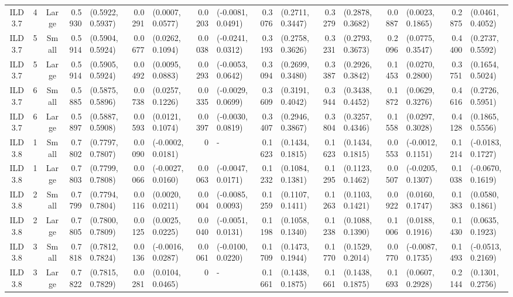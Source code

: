 \begin{landscape}
\begin{table}
\begin{tabular}{cccrlrlrlrlrlrlrl}
ILD3.7	&	4	&	Large	&	0.5930	&	(0.5922, 0.5937)	&	0.0291	&	(0.0007, 0.0577)	&	0.0203	&	(-0.0081, 0.0491)	&	0.3076	&	(0.2711, 0.3447)	&	0.3279	&	(0.2878, 0.3682)	&	0.0887	&	(0.0023, 0.1865)	&	0.2875	&	(0.0461, 0.4052)	\\
ILD3.7	&	5	&	Small	&	0.5914	&	(0.5904, 0.5924)	&	0.0677	&	(0.0262, 0.1094)	&	0.0038	&	(-0.0241, 0.0312)	&	0.3193	&	(0.2758, 0.3626)	&	0.3231	&	(0.2793, 0.3673)	&	0.2096	&	(0.0775, 0.3547)	&	0.4400	&	(0.2737, 0.5592)	\\
ILD3.7	&	5	&	Large	&	0.5914	&	(0.5905, 0.5924)	&	0.0492	&	(0.0095, 0.0883)	&	0.0293	&	(-0.0053, 0.0642)	&	0.3094	&	(0.2699, 0.3480)	&	0.3387	&	(0.2926, 0.3842)	&	0.1453	&	(0.0270, 0.2800)	&	0.3751	&	(0.1654, 0.5024)	\\
ILD3.7	&	6	&	Small	&	0.5885	&	(0.5875, 0.5896)	&	0.0738	&	(0.0257, 0.1226)	&	0.0335	&	(-0.0029, 0.0699)	&	0.3609	&	(0.3191, 0.4042)	&	0.3944	&	(0.3438, 0.4452)	&	0.1872	&	(0.0629, 0.3276)	&	0.4616	&	(0.2726, 0.5951)	\\
ILD3.7	&	6	&	Large	&	0.5897	&	(0.5887, 0.5908)	&	0.0593	&	(0.0121, 0.1074)	&	0.0397	&	(-0.0030, 0.0819)	&	0.3407	&	(0.2946, 0.3867)	&	0.3804	&	(0.3257, 0.4346)	&	0.1558	&	(0.0297, 0.3028)	&	0.4128	&	(0.1865, 0.5556)	\\
ILD3.8	&	1	&	Small	&	0.7802	&	(0.7797, 0.7807)	&	0.0090	&	(-0.0002, 0.0181)	&	0	&	-	&	0.1623	&	(0.1434, 0.1815)	&	0.1623	&	(0.1434, 0.1815)	&	0.0553	&	(-0.0012, 0.1151)	&	0.1214	&	(-0.0183, 0.1727)	\\
ILD3.8	&	1	&	Large	&	0.7803	&	(0.7799, 0.7808)	&	0.0066	&	(-0.0027, 0.0160)	&	0.0063	&	(-0.0047, 0.0171)	&	0.1232	&	(0.1084, 0.1381)	&	0.1295	&	(0.1123, 0.1462)	&	0.0507	&	(-0.0205, 0.1307)	&	0.1038	&	(-0.0670, 0.1619)	\\
ILD3.8	&	2	&	Small	&	0.7799	&	(0.7794, 0.7804)	&	0.0116	&	(0.0020, 0.0211)	&	0.0004	&	(-0.0085, 0.0093)	&	0.1259	&	(0.1107, 0.1411)	&	0.1263	&	(0.1103, 0.1421)	&	0.0922	&	(0.0160, 0.1747)	&	0.1383	&	(0.0580, 0.1861)	\\
ILD3.8	&	2	&	Large	&	0.7805	&	(0.7800, 0.7809)	&	0.0125	&	(0.0025, 0.0225)	&	0.0040	&	(-0.0051, 0.0131)	&	0.1198	&	(0.1058, 0.1340)	&	0.1238	&	(0.1088, 0.1390)	&	0.1006	&	(0.0188, 0.1916)	&	0.1430	&	(0.0635, 0.1923)	\\
ILD3.8	&	3	&	Small	&	0.7818	&	(0.7812, 0.7824)	&	0.0136	&	(-0.0016, 0.0287)	&	0.0061	&	(-0.0100, 0.0220)	&	0.1709	&	(0.1473, 0.1944)	&	0.1770	&	(0.1529, 0.2014)	&	0.0770	&	(-0.0087, 0.1735)	&	0.1493	&	(-0.0513, 0.2169)	\\
ILD3.8	&	3	&	Large	&	0.7822	&	(0.7815, 0.7829)	&	0.0281	&	(0.0104, 0.0465)	&	0	&	-	&	0.1661	&	(0.1438, 0.1875)	&	0.1661	&	(0.1438, 0.1875)	&	0.1693	&	(0.0607, 0.2928)	&	0.2144	&	(0.1301, 0.2756)	\\

\end{tabular}
\end{table}
\end{landscape}
